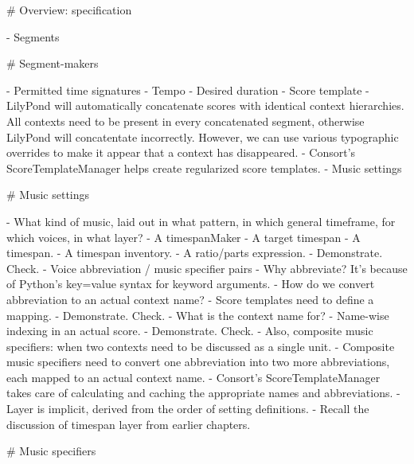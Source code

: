 \begin{markdown}
#   Overview: specification

-   Segments

#   Segment-makers

-   Permitted time signatures
-   Tempo
-   Desired duration
-   Score template
    -   LilyPond will automatically concatenate scores with identical
        context hierarchies. All contexts need to be present in every
        concatenated segment, otherwise LilyPond will concatentate
        incorrectly. However, we can use various typographic overrides to
        make it appear that a context has disappeared.
    -   Consort's ScoreTemplateManager helps create regularized score
        templates.
-   Music settings

#   Music settings

-   What kind of music, laid out in what pattern, in which general
    timeframe, for which voices, in what layer?
-   A timespanMaker
-   A target timespan
    -   A timespan.
    -   A timespan inventory.
    -   A ratio/parts expression.
        -   Demonstrate. Check.
-   Voice abbreviation / music specifier pairs
    -   Why abbreviate? It's because of Python's key=value syntax for
        keyword arguments.
    -   How do we convert abbreviation to an actual context name?
        -   Score templates need to define a mapping.
        -   Demonstrate. Check.
    -   What is the context name for?
        -   Name-wise indexing in an actual score.
        -   Demonstrate. Check.
    -   Also, composite music specifiers: when two contexts need to be
        discussed as a single unit.
        -   Composite music specifiers need to convert one abbreviation into
            two more abbreviations, each mapped to an actual context name.
        -   Consort's ScoreTemplateManager takes care of calculating and
            caching the appropriate names and abbreviations.
-   Layer is implicit, derived from the order of setting definitions.
    -   Recall the discussion of timespan layer from earlier chapters.

# Music specifiers


\end{markdown}
